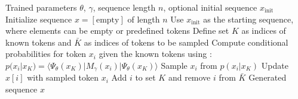 
\begin{algorithm}[H]
\caption{Generative Sampling with Conditional Dependencies}
\label{alg:gen}
\begin{algorithmic}
\REQUIRE Trained parameters $\theta$, $\gamma$, sequence length $n$, optional initial sequence $x_{\text{init}}$
    \STATE Initialize sequence $x = [ \text{empty} ]$ of length $n$
\ELSE
    \STATE Use $x_{\text{init}}$ as the starting sequence, where elements can be empty or predefined tokens
\ENDIF
\STATE Define set $K$ as indices of known tokens and $\bar{K}$ as indices of tokens to be sampled
            \STATE Compute conditional probabilities for token $x_i$ given the known tokens using :
            \STATE $p(x_i|x_{K}) = \langle \Psi_{\theta}(x_{K}) | M_{\gamma}(x_i) | \Psi_{\theta}(x_{K}) \rangle$
            \STATE Sample $x_i$ from $p(x_i|x_{K})$
            \STATE Update $x[i]$ with sampled token $x_i$
            \STATE Add $i$ to set $K$ and remove $i$ from $\bar{K}$
        \ENDIF
    \ENDFOR
\ENDWHILE
\ENSURE Generated sequence $x$
\end{algorithmic}
\end{algorithm}

